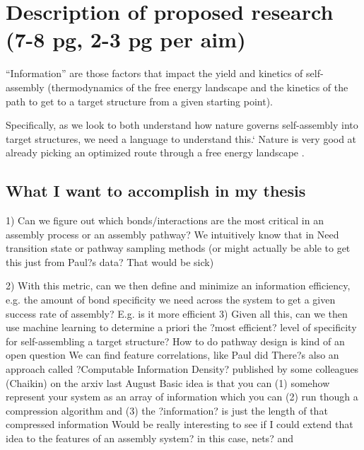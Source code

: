 \section{Description of proposed research (7-8 pg, 2-3 pg per aim)}

``Information'' are those factors that impact the yield and kinetics of self-assembly (thermodynamics of the free energy landscape and the kinetics of the path to get to a target structure from a given starting point).

Specifically, as we look to both understand how nature governs self-assembly into target structures, we need a language to understand this.`
Nature is very good at already picking an optimized route through a free energy landscape \cite{Jacobs_2016_BiophysicalJournal}.

\subsection{What I want to accomplish in my thesis}

1) Can we figure out which bonds/interactions are the most critical in an assembly process or an assembly pathway?
We intuitively know that in 
Need transition state or pathway sampling methods (or might actually be able to get this just from Paul?s data? That would be sick)

2) With this metric, can we then define and minimize an information efficiency, e.g. the amount of bond specificity we need across the system to get a given success rate of assembly?
E.g. is it more efficient 
3) Given all this, can we then use machine learning to determine a priori the ?most efficient? level of specificity for self-assembling a target structure?
How to do pathway design is kind of an open question
We can find feature correlations, like Paul did
There?s also an approach called ?Computable Information Density? published by some colleagues (Chaikin) on the arxiv last August
Basic idea is that you can (1) somehow represent your system as an array of information which you can (2) run though a compression algorithm and (3) the ?information? is just the length of that compressed information
Would be really interesting to see if I could extend that idea to the features of an assembly system? in this case, nets? and 


